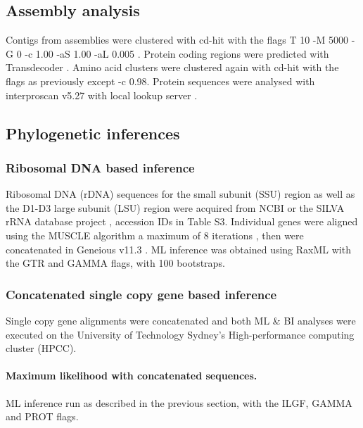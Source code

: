\documentclass[12pt]{article}
\begin{document}
\subsection*{Assembly analysis}
Contigs from assemblies were clustered with cd-hit with the flags T 10 -M 5000 -G 0 -c 1.00 -aS 1.00 -aL 0.005 \cite{fu2012cd}. 
Protein coding regions were predicted with Transdecoder \cite{haas2016transdecoder}.
Amino acid clusters were clustered again with cd-hit with the flags as previously except -c 0.98.
Protein sequences were analysed with interproscan v5.27 with local lookup server \cite{quevillon2005interproscan}.

\subsection*{Phylogenetic inferences}
\subsubsection*{Ribosomal DNA based inference}
Ribosomal DNA (rDNA) sequences for the small subunit (SSU) region as well as the D1-D3 large subunit (LSU) region were acquired from NCBI \cite{coordinators2017database} or the SILVA rRNA database project \cite{silvaproj}, accession IDs in Table S3. 
Individual genes were aligned using the MUSCLE algorithm a maximum of 8 iterations \cite{edgar2004muscle}, then were concatenated in Geneious v11.3 \cite{kearse2012geneious}.
ML inference was obtained using RaxML \cite{stamatakis2014raxml} with the GTR and GAMMA flags, with 100 bootstraps.

\subsubsection*{Concatenated single copy gene based inference}
Single copy gene alignments were concatenated and both ML \& BI analyses were executed on the University of Technology Sydney's High-performance computing cluster (HPCC).
\paragraph*{Maximum likelihood with concatenated sequences.}
ML inference run as described in the previous section, with the ILGF, GAMMA and PROT flags.
\end{document}
